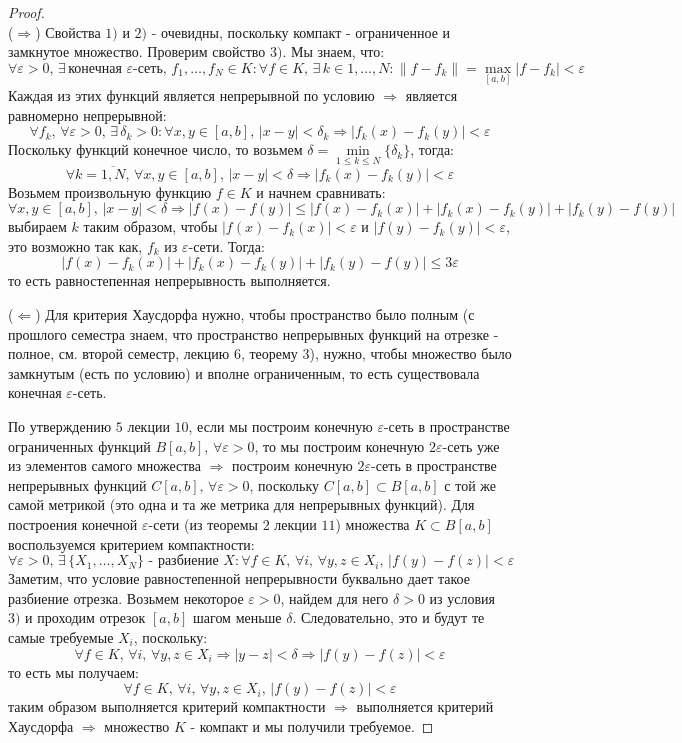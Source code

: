 \documentclass[12pt]{article}
\newcommand{\VE}{\varepsilon}
\theoremstyle{definition}
\begin{document}
\begin{proof}\hfill\\
	($\Rightarrow$) Свойства $1)$ и $2)$ - очевидны, поскольку компакт - ограниченное и замкнутое множество. Проверим свойство $3)$. Мы знаем, что:
	$$
		\forall \VE > 0, \, \exists \, \text{конечная }\VE\text{-сеть}, \, f_1, \dotsc, f_N \in K \colon \forall f \in K, \, \exists \, k \in {1,\dotsc, N}\colon \|f - f_k\| = \max\limits_{[a,b]}|f - f_k|  <\VE
	$$
	Каждая из этих функций является непрерывной по условию $\Rightarrow$ является равномерно непрерывной: 
	$$
		\forall f_k, \, \forall \VE > 0, \, \exists \, \delta_k > 0 \colon \forall x,y \in [a,b], \, |x - y| < \delta_k \Rightarrow |f_k(x) - f_k(y)| < \VE 
	$$
	Поскольку функций конечное число, то возьмем $\delta = \min\limits_{1 \leq k \leq N}\{\delta_k\}$, тогда:
	$$
		\forall k = \overline{1,N}, \, \forall x, y \in [a,b], \, |x - y| < \delta \Rightarrow |f_k(x) - f_k(y)| < \VE 
	$$
	Возьмем произвольную функцию $f \in K$ и начнем сравнивать:
	$$
		\forall x, y \in [a,b], \, |x -y| < \delta \Rightarrow |f(x) - f(y)| \leq |f(x) - f_k(x)| + |f_k(x) - f_k(y)| + |f_k(y) - f(y)|
	$$
	выбираем $k$ таким образом, чтобы $|f(x) - f_k(x)| < \VE$ и $|f(y) - f_k(y)| < \VE$, это возможно так как, $f_k$ из $\VE$-сети. Тогда:
	$$
		|f(x) - f_k(x)| + |f_k(x) - f_k(y)| + |f_k(y) - f(y)| \leq 3\VE
	$$
	то есть равностепенная непрерывность выполняется.
	
	($\Leftarrow$) Для критерия Хаусдорфа нужно, чтобы пространство было полным (с прошлого семестра знаем, что пространство непрерывных функций на отрезке - полное, см. второй семестр, лекцию $6$, теорему $3$), нужно, чтобы множество было замкнутым (есть по условию) и вполне ограниченным, то есть существовала конечная $\VE$-сеть. 
	
	По утверждению $5$ лекции $10$, если мы построим конечную $\VE$-сеть в пространстве ограниченных функций $B[a,b], \, \forall \VE > 0$, то мы построим конечную $2\VE$-сеть уже из элементов самого множества $\Rightarrow$ построим конечную $2\VE$-сеть в пространстве непрерывных функций $C[a,b], \, \forall \VE > 0$, поскольку $C[a,b] \subset B[a,b]$ с той же самой метрикой (это одна и та же метрика для непрерывных функций). Для построения конечной $\VE$-сети (из теоремы $2$ лекции $11$) множества $K \subset B[a,b]$ воспользуемся критерием компактности:
	$$
		\forall \VE > 0, \, \exists \, \{X_1, \dotsc, X_N\} \text{ - разбиение }X \colon \forall f \in K,\,\forall i, \, \forall y,z \in X_i, \, |f(y) - f(z)| < \VE
	$$
	Заметим, что условие равностепенной непрерывности буквально дает такое разбиение отрезка. Возьмем некоторое $\VE > 0$, найдем для него $\delta > 0$ из условия $3)$ и проходим отрезок $[a,b]$ шагом меньше $\delta$. Следовательно, это и будут те самые требуемые $X_i$, поскольку:
	$$
		\forall f \in K, \, \forall i, \, \forall y,z \in X_i \Rightarrow |y - z| < \delta \Rightarrow |f(y) - f(z)| < \VE
	$$
	то есть мы получаем:
	$$
		\forall f \in K, \, \forall i, \, \forall y,z \in X_i, \,|f(y) - f(z)| < \VE
	$$
	таким образом выполняется критерий компактности $\Rightarrow$ выполняется критерий Хаусдорфа $\Rightarrow$ множество $K$ - компакт и мы получили требуемое.
\end{proof}
\end{document}
